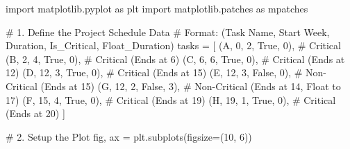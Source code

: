 \documentclass[
  letterpaper,
  DIV=11,
  numbers=noendperiod]{scrreprt}
\newenvironment{Shaded}{\begin{snugshade}}{\end{snugshade}}
\newcommand{\CommentTok}[1]{\textcolor[rgb]{0.37,0.37,0.37}{#1}}
\newcommand{\DecValTok}[1]{\textcolor[rgb]{0.68,0.00,0.00}{#1}}
\newcommand{\ImportTok}[1]{\textcolor[rgb]{0.00,0.46,0.62}{#1}}
\newcommand{\NormalTok}[1]{\textcolor[rgb]{0.00,0.23,0.31}{#1}}
\newcommand{\OperatorTok}[1]{\textcolor[rgb]{0.37,0.37,0.37}{#1}}
\newcommand{\StringTok}[1]{\textcolor[rgb]{0.13,0.47,0.30}{#1}}
\newcommand{\VariableTok}[1]{\textcolor[rgb]{0.07,0.07,0.07}{#1}}
\begin{document}
\begin{Shaded}
\begin{Highlighting}[]
\ImportTok{import}\NormalTok{ matplotlib.pyplot }\ImportTok{as}\NormalTok{ plt}
\ImportTok{import}\NormalTok{ matplotlib.patches }\ImportTok{as}\NormalTok{ mpatches}

\CommentTok{\# 1. Define the Project Schedule Data}
\CommentTok{\# Format: (Task Name, Start Week, Duration, Is\_Critical, Float\_Duration)}
\NormalTok{tasks }\OperatorTok{=}\NormalTok{ [}
\NormalTok{    (}\StringTok{\textquotesingle{}A\textquotesingle{}}\NormalTok{, }\DecValTok{0}\NormalTok{,  }\DecValTok{2}\NormalTok{, }\VariableTok{True}\NormalTok{,  }\DecValTok{0}\NormalTok{),   }\CommentTok{\# Critical}
\NormalTok{    (}\StringTok{\textquotesingle{}B\textquotesingle{}}\NormalTok{, }\DecValTok{2}\NormalTok{,  }\DecValTok{4}\NormalTok{, }\VariableTok{True}\NormalTok{,  }\DecValTok{0}\NormalTok{),   }\CommentTok{\# Critical (Ends at 6)}
\NormalTok{    (}\StringTok{\textquotesingle{}C\textquotesingle{}}\NormalTok{, }\DecValTok{6}\NormalTok{,  }\DecValTok{6}\NormalTok{, }\VariableTok{True}\NormalTok{,  }\DecValTok{0}\NormalTok{),   }\CommentTok{\# Critical (Ends at 12)}
\NormalTok{    (}\StringTok{\textquotesingle{}D\textquotesingle{}}\NormalTok{, }\DecValTok{12}\NormalTok{, }\DecValTok{3}\NormalTok{, }\VariableTok{True}\NormalTok{,  }\DecValTok{0}\NormalTok{),   }\CommentTok{\# Critical (Ends at 15)}
\NormalTok{    (}\StringTok{\textquotesingle{}E\textquotesingle{}}\NormalTok{, }\DecValTok{12}\NormalTok{, }\DecValTok{3}\NormalTok{, }\VariableTok{False}\NormalTok{, }\DecValTok{0}\NormalTok{),   }\CommentTok{\# Non{-}Critical (Ends at 15)}
\NormalTok{    (}\StringTok{\textquotesingle{}G\textquotesingle{}}\NormalTok{, }\DecValTok{12}\NormalTok{, }\DecValTok{2}\NormalTok{, }\VariableTok{False}\NormalTok{, }\DecValTok{3}\NormalTok{),   }\CommentTok{\# Non{-}Critical (Ends at 14, Float to 17)}
\NormalTok{    (}\StringTok{\textquotesingle{}F\textquotesingle{}}\NormalTok{, }\DecValTok{15}\NormalTok{, }\DecValTok{4}\NormalTok{, }\VariableTok{True}\NormalTok{,  }\DecValTok{0}\NormalTok{),   }\CommentTok{\# Critical (Ends at 19)}
\NormalTok{    (}\StringTok{\textquotesingle{}H\textquotesingle{}}\NormalTok{, }\DecValTok{19}\NormalTok{, }\DecValTok{1}\NormalTok{, }\VariableTok{True}\NormalTok{,  }\DecValTok{0}\NormalTok{),   }\CommentTok{\# Critical (Ends at 20)}
\NormalTok{]}

\CommentTok{\# 2. Setup the Plot}
\NormalTok{fig, ax }\OperatorTok{=}\NormalTok{ plt.subplots(figsize}\OperatorTok{=}\NormalTok{(}\DecValTok{10}\NormalTok{, }\DecValTok{6}\NormalTok{))}


\end{Highlighting}
\end{Shaded}
\end{document}
